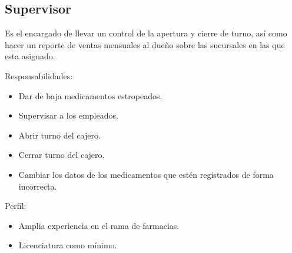 \begin{Usuario}{\hypertarget{Supervisor}{\subsection{Supervisor}}}{
	Es el encargado de llevar un control de la apertura y cierre de turno,
	así como hacer un reporte de ventas mensuales al dueño sobre las sucursales en las que esta asignado.
}
    \item[Responsabilidades:] \cdtEmpty
    \begin{itemize}
		\item Dar de baja medicamentos estropeados.
		\item Supervisar a los empleados.
		\item Abrir turno del cajero.
		\item Cerrar turno del cajero.
		\item Cambiar los datos de los medicamentos que estén registrados de forma incorrecta.
    \end{itemize}
    
	\item[Perfil:] \cdtEmpty
    \begin{itemize}
		\item Amplia experiencia en el rama de farmacias.
		\item Licenciatura como mínimo.
    \end{itemize}
\end{Usuario}

